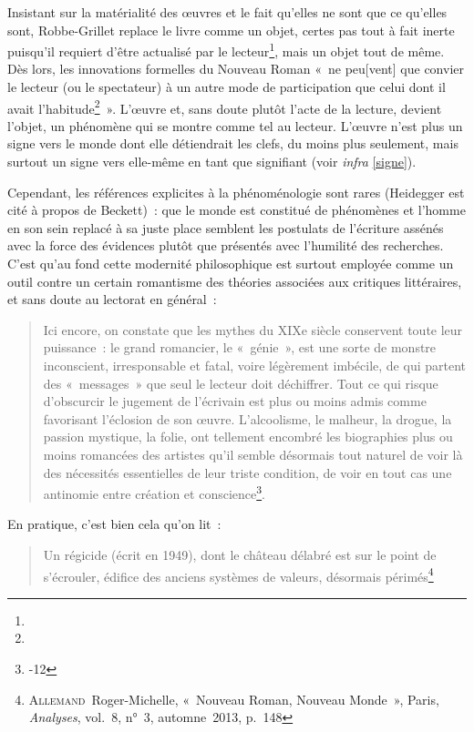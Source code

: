 Insistant sur la matérialité des œuvres et le fait qu'elles ne sont que ce qu'elles sont, Robbe-Grillet replace le livre comme un objet, certes pas tout à fait inerte puisqu'il requiert d'être actualisé par le lecteur\footnote{}, mais un objet tout de même. Dès lors, les innovations formelles du Nouveau Roman «~ne peu[vent] que convier le lecteur (ou le spectateur) à un autre mode de participation que celui dont il avait l’habitude\footnote{}~». L'œuvre et, sans doute plutôt l'acte de la lecture, devient l'objet, un phénomène qui se montre comme tel au lecteur. L'œuvre n'est plus un signe vers le monde dont elle détiendrait les clefs, du moins plus seulement, mais surtout un signe vers elle-même en tant que signifiant (voir \textit{infra} \ref{signe}). 
    



Cependant, les références explicites à la phénoménologie sont rares (Heidegger est cité à propos de Beckett)~: que le monde est constitué de phénomènes et l'homme en son sein replacé à sa juste place semblent les postulats de l'écriture assénés avec la force des évidences plutôt que présentés avec l'humilité des recherches. C'est qu'au fond cette modernité philosophique est surtout employée comme un outil contre un certain romantisme des théories associées aux critiques littéraires, et sans doute au lectorat en général~:
\begin{quote}
    Ici encore, on constate que les mythes du XIXe siècle conservent toute leur puissance~: le grand romancier, le «~génie~», est une sorte de monstre inconscient, irresponsable et fatal, voire légèrement imbécile, de qui partent des «~messages~» que seul le lecteur doit déchiffrer. Tout ce qui risque d’obscurcir le jugement de l’écrivain est plus ou moins admis comme favorisant l’éclosion de son œuvre. L’alcoolisme, le malheur, la drogue, la passion mystique, la folie, ont tellement encombré les biographies plus ou moins romancées des artistes qu’il semble désormais tout naturel de voir là des nécessités essentielles de leur triste condition, de voir en tout cas une antinomie entre création et conscience\footnote{-12}.
\end{quote}
En pratique, c'est bien cela qu'on lit~:
\begin{quote}
    Un régicide (écrit en 1949), dont le château délabré est sur le
point de s’écrouler, édifice des anciens systèmes de valeurs,
désormais périmés\footnote{\textsc{Allemand}~Roger-Michelle, «~Nouveau Roman, Nouveau Monde~», Paris, \textit{Analyses}, vol.~8, n°~3, automne~2013, p.~148}
\end{quote}

